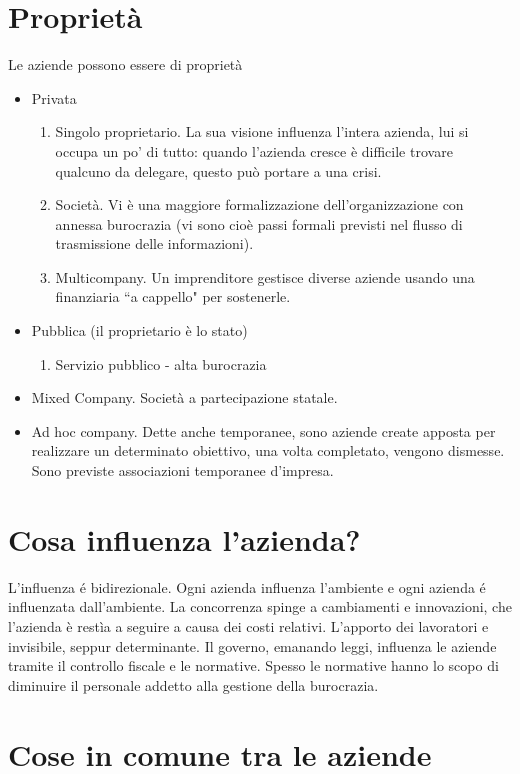 \section{Propriet\`a}
Le aziende possono essere di propriet\`a
\begin{itemize}
\item Privata
\begin{enumerate}
\item Singolo proprietario. La sua visione influenza l'intera azienda, lui si occupa un po' di tutto: quando l'azienda cresce \`e difficile trovare qualcuno da delegare, questo pu\`o portare a una crisi.
\item Societ\`a. Vi \`e una maggiore formalizzazione dell'organizzazione con annessa burocrazia (vi sono cio\`e passi formali previsti nel flusso di trasmissione delle informazioni).
\item Multicompany. Un imprenditore gestisce diverse aziende usando una finanziaria ``a cappello" per sostenerle.
\end{enumerate}
\item Pubblica (il proprietario \`e lo stato)
\begin{enumerate}
	\item Servizio pubblico - alta burocrazia
\end{enumerate}
\item Mixed Company. Societ\`a a partecipazione statale.
\item Ad hoc company. Dette anche temporanee, sono aziende create apposta per realizzare un determinato obiettivo, una volta completato, vengono dismesse. Sono previste associazioni temporanee d'impresa.
\end{itemize}

\section{Cosa influenza l'azienda?}
L'influenza \'e bidirezionale. Ogni azienda influenza l'ambiente e ogni azienda \'e influenzata dall'ambiente.
La concorrenza spinge a cambiamenti e innovazioni, che l'azienda \`e rest\`ia a seguire a causa dei costi relativi.
L'apporto dei lavoratori e invisibile, seppur determinante.
Il governo, emanando leggi, influenza le aziende tramite il controllo fiscale e le normative. Spesso le normative hanno lo scopo di diminuire il personale addetto alla gestione della burocrazia.
\section{Cose in comune tra le aziende}
